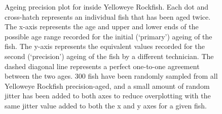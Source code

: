 \documentclass[11pt]{book}
\begin{document}
\begin{figure}[htb]

{\centering {} 

}

\caption{Ageing precision plot for inside Yelloweye Rockfish. Each dot and cross-hatch represents an individual fish that has been aged twice. The x-axis represents the age and upper and lower ends of the possible age range recorded for the initial (`primary') ageing of the fish. The y-axis represents the equivalent values recorded for the second (`precision') ageing of the fish by a different technician. The dashed diagonal line represents a perfect one-to-one agreement between the two ages. 300 fish have been randomly sampled from all Yelloweye Rockfish precision-aged, and a small amount of random jitter has been added to both axes to reduce overplotting with the same jitter value added to both the x and y axes for a given fish.}\label{fig:age-precision}
\end{figure}
\end{document}
